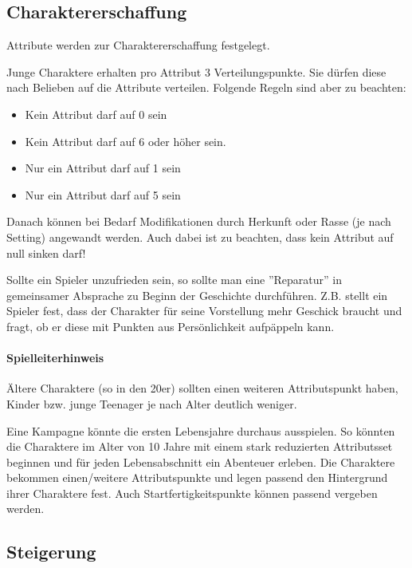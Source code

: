 \documentclass{article}
\begin{document}
\begin{center}
\subsection{Charaktererschaffung}
\end{center}

Attribute werden zur Charaktererschaffung festgelegt.

Junge Charaktere erhalten pro Attribut 3 Verteilungspunkte. Sie dürfen diese
nach Belieben auf die Attribute verteilen. Folgende Regeln sind aber zu beachten:

\begin{itemize}
\item Kein Attribut darf auf 0 sein
\item Kein Attribut darf auf 6 oder höher sein.
\item Nur ein Attribut darf auf 1 sein
\item Nur ein Attribut darf auf 5 sein
\end{itemize}

Danach können bei Bedarf Modifikationen durch Herkunft oder Rasse (je nach Setting) angewandt werden. Auch dabei ist zu
beachten, dass kein Attribut auf null sinken darf!

Sollte ein Spieler unzufrieden sein, so sollte man eine ''Reparatur'' in gemeinsamer Absprache zu Beginn der Geschichte
durchführen. Z.B. stellt ein Spieler fest, dass der Charakter für seine Vorstellung mehr Geschick braucht und fragt, ob
er diese mit Punkten aus Persönlichkeit aufpäppeln kann.

\begin{mdframed}[hidealllines=true, backgroundcolor=black!10]
\paragraph{Spielleiterhinweis}

Ältere Charaktere (so in den 20er) sollten einen weiteren Attributspunkt haben, Kinder bzw. junge Teenager je nach
Alter deutlich weniger.

Eine Kampagne könnte die ersten Lebensjahre durchaus ausspielen. So könnten die Charaktere im Alter von 10 Jahre
mit einem stark reduzierten Attributsset beginnen und für jeden Lebensabschnitt ein Abenteuer erleben. Die Charaktere
bekommen einen/weitere Attributspunkte und legen passend den Hintergrund ihrer Charaktere fest.
Auch Startfertigkeitspunkte können passend vergeben werden.

\end{mdframed}
\begin{center}
\subsection{Steigerung}
\end{center}
\end{document}
